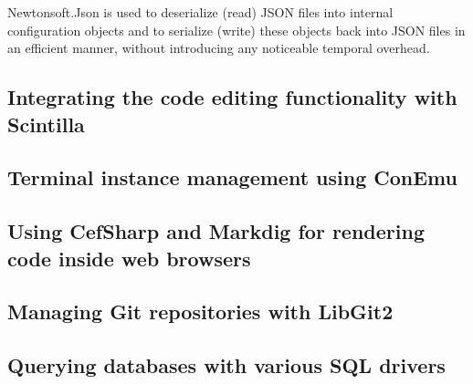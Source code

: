 Newtonsoft.Json is used to deserialize (read) JSON files into internal configuration objects and to serialize (write) these objects back into JSON files in an efficient manner, without introducing any noticeable temporal overhead.

\subsection{Integrating the code editing functionality with Scintilla}
\subsection{Terminal instance management using ConEmu}
\subsection{Using CefSharp and Markdig for rendering code inside web browsers}
\subsection{Managing Git repositories with LibGit2}
\subsection{Querying databases with various SQL drivers}